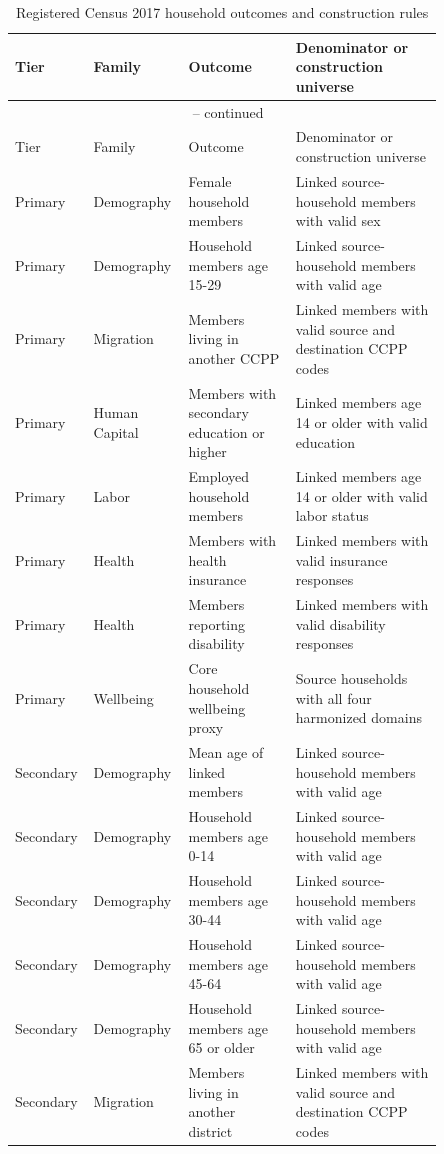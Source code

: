 \begingroup
\small
\begin{longtable}{p{0.10\linewidth}p{0.18\linewidth}p{0.24\linewidth}p{0.33\linewidth}}
\caption{Registered Census 2017 household outcomes and construction rules}
\label{tab:rd_outcome_registry_2017_household} \\
\toprule
Tier & Family & Outcome & Denominator or construction universe \\
\midrule
\endfirsthead
\multicolumn{4}{c}{\tablename\ \thetable{} -- continued} \\
\toprule
Tier & Family & Outcome & Denominator or construction universe \\
\midrule
\endhead
Primary & Demography & Female household members & Linked source-household members with valid sex \\
Primary & Demography & Household members age 15-29 & Linked source-household members with valid age \\
Primary & Migration & Members living in another CCPP & Linked members with valid source and destination CCPP codes \\
Primary & Human Capital & Members with secondary education or higher & Linked members age 14 or older with valid education \\
Primary & Labor & Employed household members & Linked members age 14 or older with valid labor status \\
Primary & Health & Members with health insurance & Linked members with valid insurance responses \\
Primary & Health & Members reporting disability & Linked members with valid disability responses \\
Primary & Wellbeing & Core household wellbeing proxy & Source households with all four harmonized domains \\
Secondary & Demography & Mean age of linked members & Linked source-household members with valid age \\
Secondary & Demography & Household members age 0-14 & Linked source-household members with valid age \\
Secondary & Demography & Household members age 30-44 & Linked source-household members with valid age \\
Secondary & Demography & Household members age 45-64 & Linked source-household members with valid age \\
Secondary & Demography & Household members age 65 or older & Linked source-household members with valid age \\
Secondary & Migration & Members living in another district & Linked members with valid source and destination CCPP codes \\

\end{longtable}
